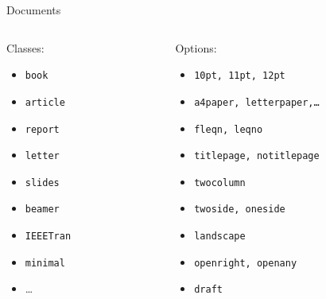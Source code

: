 	\begin{frame}{Documents}
    	\begin{columns}
        	\begin{column}{3cm}
              Classes:
              \begin{itemize}
                  \item \texttt{book}
                  \item \texttt{article}
                  \item \texttt{report}
                  \item \texttt{letter}
                  \item \texttt{slides}
                  \item \texttt{beamer}
                  \item \texttt{IEEETran}
                  \item \texttt{minimal}
                  \item \ldots
              \end{itemize}
        	\end{column}
            \begin{column}{7cm}
              Options:
              \begin{itemize}
                  \item \texttt{10pt, 11pt, 12pt}
                  \item \texttt{a4paper, letterpaper,\ldots}
                  \item \texttt{fleqn, leqno}
                  \item \texttt{titlepage, notitlepage}
                  \item \texttt{twocolumn}
                  \item \texttt{twoside, oneside}
                  \item \texttt{landscape}
                  \item \texttt{openright, openany}
                  \item \texttt{draft}
              \end{itemize}
        	\end{column}
    	\end{columns}
	\end{frame}

